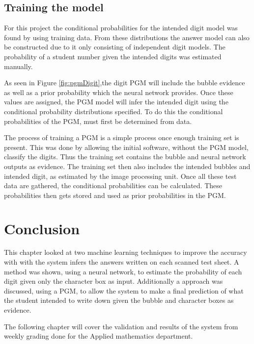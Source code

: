 \subsection{Training the model}

For this project the conditional probabilities for the intended digit model was found by using training data. From these distributions the answer model can also be constructed due to it only consisting of independent digit models. The probability of a student number given the intended digits was estimated manually.

As seen in Figure \ref{fig:pgmDigit},the digit PGM will include the bubble evidence as well as a prior probability which the neural network provides. Once these values are assigned, the PGM model will infer the intended digit using the conditional probability distributions specified. To do this the conditional probabilities of the PGM, must first be determined from data.



The process of training a PGM is a simple process once enough training set is present. This was done by allowing the initial software, without the PGM model, classify the digits. Thus the training set contains the bubble and neural network outputs as evidence. The training set then also includes the intended bubbles and intended digit, as estimated by the image processing unit. Once all these test data are gathered, the conditional probabilities can be calculated. These probabilities then gets stored and used as prior probabilities in the PGM.

\section{Conclusion}

This chapter looked at two machine learning techniques to improve the accuracy with with the system infers the answers written on each scanned test sheet. A method was shown, using a neural network, to estimate the probability of each digit given only the character box as input. Additionally a approach was discussed, using a PGM, to allow the system to make a final prediction of what the student intended to write down given the bubble and character boxes as evidence.

The following chapter will cover the validation and results of the system from weekly grading done for the Applied mathematics department.